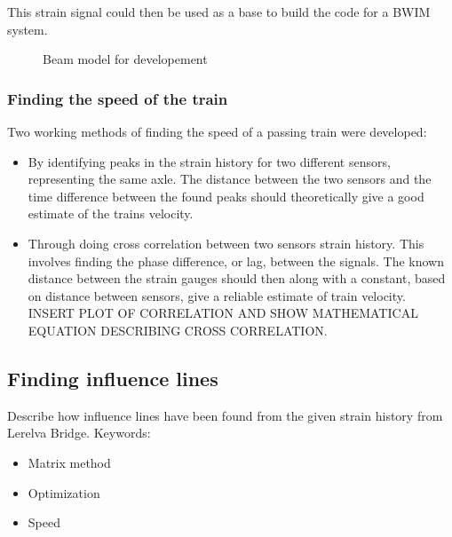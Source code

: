 This strain signal could then be used as a base to build the code for a BWIM system.

\begin{figure}
\caption{Beam model for developement}
\label{figure:beam_model}

\end{figure}


\subsubsection{Finding the speed of the train}
Two working methods of finding the speed of a passing train were developed:
\begin{itemize}
 \item By identifying peaks in the strain history for two different sensors, representing the same axle. The distance between the two sensors and the time difference between the found peaks should theoretically give a good estimate of the trains velocity.
 \item Through doing cross correlation between two sensors strain history. This involves finding the phase difference, or lag, between the signals. The known distance between the strain gauges should then along with a constant, based on distance between sensors, give a reliable estimate of train velocity. INSERT PLOT OF CORRELATION AND SHOW MATHEMATICAL EQUATION DESCRIBING CROSS CORRELATION.
\end{itemize}

\subsection{Finding influence lines}
Describe how influence lines have been found from the given strain history from Lerelva Bridge.
Keywords:
\begin{itemize}
\item Matrix method
\item Optimization
\item Speed
\end{itemize}
